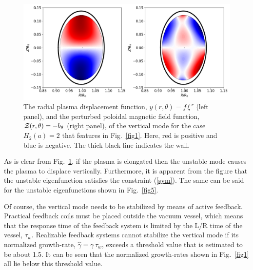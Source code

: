 \documentclass[12pt,prb,aps]{revtex4-1}
\begin{document}
\begin{figure}
\centerline{\includegraphics[width=\textwidth]{Fig2.png}}
\caption{The radial plasma displacement function, $y(r,\theta)=f\,\xi^{\,r}$ (left panel), and the perturbed poloidal magnetic
field function, ${\cal Z}(r,\theta)= - b_\theta$ (right panel), of the vertical  mode  for the case $H_2(a)=2$ that features in Fig.~\ref{fig1}.
Here, red is positive and blue is negative. The thick black line indicates the wall. \label{fig2}}
\end{figure}

 As is clear from Fig.~\ref{fig2}, if the plasma is  elongated then the unstable mode causes the
plasma to displace vertically. Furthermore, it is apparent  from the figure that the unstable eigenfunction satisfies the constraint (\ref{sym}).  The same can be
said for the unstable eigenfunctions shown in Fig.~\ref{fig5}.

Of course, the vertical mode needs to be stabilized by means of active feedback. Practical feedback coils must be
placed outside the vacuum vessel, which means that the response time of the feedback system is limited by the L/R time of the vessel, $\tau_w$.  Realizable feedback
systems cannot stabilize the vertical mode if its normalized growth-rate, $\hat{\gamma}=\gamma\,\tau_w$, exceeds a threshold value that is estimated to be about
1.5.\cite{f2} It can be seen that the normalized growth-rates shown in Fig.~\ref{fig1} all lie below this threshold value. 
\end{document}
